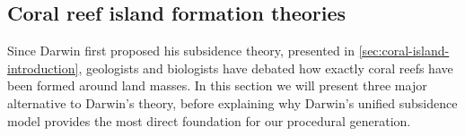 \subsection{Coral reef island formation theories}
\label{sec:coral-island-sota-coral-theories}
Since Darwin first proposed his subsidence theory, presented in \cref{sec:coral-island-introduction}, geologists and biologists have debated how exactly coral reefs have been formed around land masses. In this section we will present three major alternative to Darwin's theory, before explaining why Darwin's unified subsidence model provides the most direct foundation for our procedural generation.



